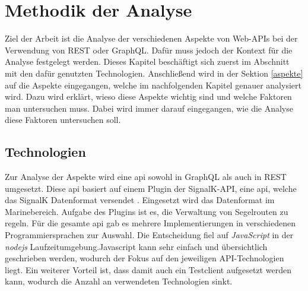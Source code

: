 \chapter{Methodik der Analyse}\label{methodik}

Ziel der Arbeit ist die Analyse der verschiedenen Aspekte von Web-APIs bei der Verwendung von REST oder GraphQL. Dafür muss jedoch der Kontext für die Analyse festgelegt werden. Dieses Kapitel beschäftigt sich zuerst im Abschnitt  mit den dafür genutzten Technologien. Anschließend wird in der Sektion \ref{aspekte} auf die Aspekte eingegangen, welche im nachfolgenden Kapitel genauer analysiert wird. Dazu wird erklärt, wieso diese Aspekte wichtig sind und welche Faktoren man untersuchen muss. Dabei wird immer darauf eingegangen, wie die Analyse diese Faktoren untersuchen soll.

\section{Technologien}\label{technologien}

Zur Analyse der Aspekte wird eine \ac{api} sowohl in GraphQL als auch in \ac{REST} umgesetzt. Diese \ac{api} basiert auf einem Plugin der SignalK-API, eine \ac{api}, welche das SignalK Datenformat versendet \parencite{signalkServerNode2020}. Eingesetzt wird das Datenformat im Marinebereich. Aufgabe des Plugins ist es, die Verwaltung von Segelrouten zu regeln. Für die gesamte \ac{api} gab es mehrere Implementierungen in verschiedenen Programmiersprachen zur Auswahl. Die Entscheidung fiel auf \textit{JavaScript} in der \textit{nodejs} Laufzeitumgebung.Javascript kann sehr einfach und übersichtlich geschrieben werden, wodurch der Fokus auf den jeweiligen API-Technologien liegt. Ein weiterer Vorteil ist, dass damit auch ein Testclient aufgesetzt werden kann, wodurch die Anzahl an verwendeten Technologien sinkt.\\

